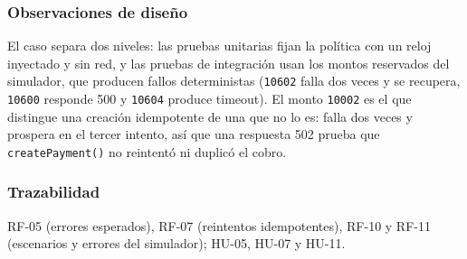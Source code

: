 \subsubsection{Observaciones de diseño}

El caso separa dos niveles: las pruebas unitarias fijan la política con un reloj inyectado y sin red, y las pruebas de integración usan los montos reservados del simulador, que producen fallos deterministas (\texttt{10602} falla dos veces y se recupera, \texttt{10600} responde 500 y \texttt{10604} produce timeout). El monto \texttt{10002} es el que distingue una creación idempotente de una que no lo es: falla dos veces y prospera en el tercer intento, así que una respuesta 502 prueba que \texttt{createPayment()} no reintentó ni duplicó el cobro.

\subsubsection{Trazabilidad}

RF-05 (errores esperados), RF-07 (reintentos idempotentes), RF-10 y RF-11 (escenarios y errores del simulador); HU-05, HU-07 y HU-11.
